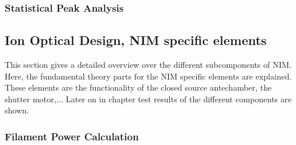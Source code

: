 	
	\subsubsection{Statistical Peak Analysis}
	

	
	\subsection{Ion Optical Design, NIM specific elements} %
	This section gives a detailed overview over the different subcomponents of NIM. Here, the fundamental theory parts for the NIM specific elements are explained. These elements are the functionality of the closed source antechamber, the shutter motor,...
	Later on in chapter  test results of the different components are shown.
	
	
		\subsubsection{Filament Power Calculation}
		
